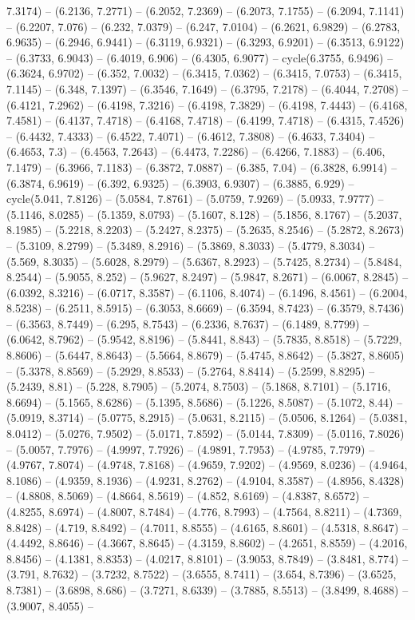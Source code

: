 7.3174) -- (6.2136, 7.2771) -- (6.2052, 7.2369) -- (6.2073, 7.1755) -- (6.2094, 7.1141) -- (6.2207, 7.076) -- (6.232, 7.0379) -- (6.247, 7.0104) -- (6.2621, 6.9829) -- (6.2783, 6.9635) -- (6.2946, 6.9441) -- (6.3119, 6.9321) -- (6.3293, 6.9201) -- (6.3513, 6.9122) -- (6.3733, 6.9043) -- (6.4019, 6.906) -- (6.4305, 6.9077) -- cycle(6.3755, 6.9496) -- (6.3624, 6.9702) -- (6.352, 7.0032) -- (6.3415, 7.0362) -- (6.3415, 7.0753) -- (6.3415, 7.1145) -- (6.348, 7.1397) -- (6.3546, 7.1649) -- (6.3795, 7.2178) -- (6.4044, 7.2708) -- (6.4121, 7.2962) -- (6.4198, 7.3216) -- (6.4198, 7.3829) -- (6.4198, 7.4443) -- (6.4168, 7.4581) -- (6.4137, 7.4718) -- (6.4168, 7.4718) -- (6.4199, 7.4718) -- (6.4315, 7.4526) -- (6.4432, 7.4333) -- (6.4522, 7.4071) -- (6.4612, 7.3808) -- (6.4633, 7.3404) -- (6.4653, 7.3) -- (6.4563, 7.2643) -- (6.4473, 7.2286) -- (6.4266, 7.1883) -- (6.406, 7.1479) -- (6.3966, 7.1183) -- (6.3872, 7.0887) -- (6.385, 7.04) -- (6.3828, 6.9914) -- (6.3874, 6.9619) -- (6.392, 6.9325) -- (6.3903, 6.9307) -- (6.3885, 6.929) -- cycle(5.041, 7.8126) -- (5.0584, 7.8761) -- (5.0759, 7.9269) -- (5.0933, 7.9777) -- (5.1146, 8.0285) -- (5.1359, 8.0793) -- (5.1607, 8.128) -- (5.1856, 8.1767) -- (5.2037, 8.1985) -- (5.2218, 8.2203) -- (5.2427, 8.2375) -- (5.2635, 8.2546) -- (5.2872, 8.2673) -- (5.3109, 8.2799) -- (5.3489, 8.2916) -- (5.3869, 8.3033) -- (5.4779, 8.3034) -- (5.569, 8.3035) -- (5.6028, 8.2979) -- (5.6367, 8.2923) -- (5.7425, 8.2734) -- (5.8484, 8.2544) -- (5.9055, 8.252) -- (5.9627, 8.2497) -- (5.9847, 8.2671) -- (6.0067, 8.2845) -- (6.0392, 8.3216) -- (6.0717, 8.3587) -- (6.1106, 8.4074) -- (6.1496, 8.4561) -- (6.2004, 8.5238) -- (6.2511, 8.5915) -- (6.3053, 8.6669) -- (6.3594, 8.7423) -- (6.3579, 8.7436) -- (6.3563, 8.7449) -- (6.295, 8.7543) -- (6.2336, 8.7637) -- (6.1489, 8.7799) -- (6.0642, 8.7962) -- (5.9542, 8.8196) -- (5.8441, 8.843) -- (5.7835, 8.8518) -- (5.7229, 8.8606) -- (5.6447, 8.8643) -- (5.5664, 8.8679) -- (5.4745, 8.8642) -- (5.3827, 8.8605) -- (5.3378, 8.8569) -- (5.2929, 8.8533) -- (5.2764, 8.8414) -- (5.2599, 8.8295) -- (5.2439, 8.81) -- (5.228, 8.7905) -- (5.2074, 8.7503) -- (5.1868, 8.7101) -- (5.1716, 8.6694) -- (5.1565, 8.6286) -- (5.1395, 8.5686) -- (5.1226, 8.5087) -- (5.1072, 8.44) -- (5.0919, 8.3714) -- (5.0775, 8.2915) -- (5.0631, 8.2115) -- (5.0506, 8.1264) -- (5.0381, 8.0412) -- (5.0276, 7.9502) -- (5.0171, 7.8592) -- (5.0144, 7.8309) -- (5.0116, 7.8026) -- (5.0057, 7.7976) -- (4.9997, 7.7926) -- (4.9891, 7.7953) -- (4.9785, 7.7979) -- (4.9767, 7.8074) -- (4.9748, 7.8168) -- (4.9659, 7.9202) -- (4.9569, 8.0236) -- (4.9464, 8.1086) -- (4.9359, 8.1936) -- (4.9231, 8.2762) -- (4.9104, 8.3587) -- (4.8956, 8.4328) -- (4.8808, 8.5069) -- (4.8664, 8.5619) -- (4.852, 8.6169) -- (4.8387, 8.6572) -- (4.8255, 8.6974) -- (4.8007, 8.7484) -- (4.776, 8.7993) -- (4.7564, 8.8211) -- (4.7369, 8.8428) -- (4.719, 8.8492) -- (4.7011, 8.8555) -- (4.6165, 8.8601) -- (4.5318, 8.8647) -- (4.4492, 8.8646) -- (4.3667, 8.8645) -- (4.3159, 8.8602) -- (4.2651, 8.8559) -- (4.2016, 8.8456) -- (4.1381, 8.8353) -- (4.0217, 8.8101) -- (3.9053, 8.7849) -- (3.8481, 8.774) -- (3.791, 8.7632) -- (3.7232, 8.7522) -- (3.6555, 8.7411) -- (3.654, 8.7396) -- (3.6525, 8.7381) -- (3.6898, 8.686) -- (3.7271, 8.6339) -- (3.7885, 8.5513) -- (3.8499, 8.4688) -- (3.9007, 8.4055) -- 